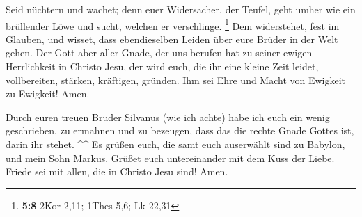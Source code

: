  Seid nüchtern und wachet; denn euer Widersacher, der
Teufel, geht umher wie ein brüllender Löwe und sucht, welchen er
verschlinge. \footnote{\textbf{5:8} 2Kor 2,11; 1Thes 5,6; Lk 22,31}
 Dem widerstehet, fest im Glauben, und wisset, dass
ebendieselben Leiden über eure Brüder in der Welt gehen. 
Der Gott aber aller Gnade, der uns berufen hat zu seiner ewigen
Herrlichkeit in Christo Jesu, der wird euch, die ihr eine kleine Zeit
leidet, vollbereiten, stärken, kräftigen, gründen.  Ihm
sei Ehre und Macht von Ewigkeit zu Ewigkeit! Amen.

 Durch euren treuen Bruder Silvanus (wie ich achte) habe
ich euch ein wenig geschrieben, zu ermahnen und zu bezeugen, dass das
die rechte Gnade Gottes ist, darin ihr stehet. \^{}\^{} 
Es grüßen euch, die samt euch auserwählt sind zu Babylon, und mein Sohn
Markus.  Grüßet euch untereinander mit dem Kuss der
Liebe. Friede sei mit allen, die in Christo Jesu sind! Amen.
